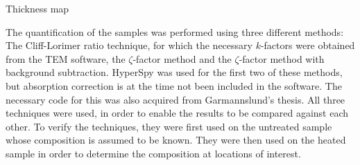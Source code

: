 Thickness map

The quantification of the samples was performed using three different methods: The Cliff-Lorimer ratio technique, for which the necessary $k$-factors were obtained from the TEM software, the $\zeta$-factor method and the $\zeta$-factor method with background subtraction. HyperSpy was used for the first two of these methods, but absorption correction is at the time not been included in the software. The necessary code for this was also acquired from Garmannslund's thesis. All three techniques were used, in order to enable the results to be compared against each other. To verify the techniques, they were first used on the untreated sample whose composition is assumed to be known. They were then used on the heated sample in order to determine the composition at locations of interest.